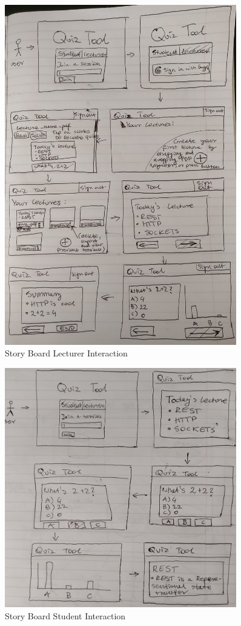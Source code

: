 \begin{figure}[h!]
    \centering
    \includegraphics[width=0.9\textwidth]{../../design/story_board_lecturer.jpg}
    \caption{Story Board Lecturer Interaction}
    \label{fig:storylecturer}
\end{figure}

\begin{figure}[ht]
    \centering
    \includegraphics[width=0.9\textwidth]{../../design/story_board_student.jpg}
    \caption{Story Board Student Interaction}
    \label{fig:storystudent}
\end{figure}


